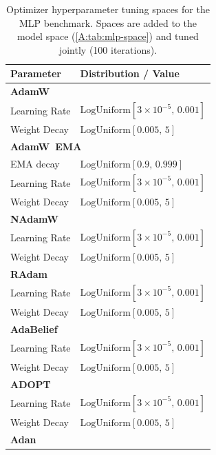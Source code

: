 \begin{table}[h]
\centering
\caption{Optimizer hyperparameter tuning spaces for the MLP benchmark.
Spaces are added to the model space (\autoref{A:tab:mlp-space})
and tuned jointly (100 iterations).}
\label{A:tab:optimizer-spaces}
\small
\setlength{\tabcolsep}{4pt}
\renewcommand{\arraystretch}{1.12}

\begin{minipage}[t]{0.48\textwidth}
\vspace{0pt}
\begin{tabular}{@{}ll@{}}
\toprule
Parameter & Distribution / Value \\
\midrule
\multicolumn{2}{l}{\textbf{AdamW}} \\
\quad Learning Rate & $\mathrm{LogUniform}[3 \!\times\! 10^{-5},\,0.001]$ \\
\quad Weight Decay & $\mathrm{LogUniform}[0.005,\,5]$ \\
\midrule
\multicolumn{2}{l}{\textbf{AdamW\ EMA}} \\
\quad EMA decay & $\mathrm{LogUniform}[0.9,\,0.999]$ \\
\quad Learning Rate & $\mathrm{LogUniform}[3 \!\times\! 10^{-5},\,0.001]$ \\
\quad Weight Decay & $\mathrm{LogUniform}[0.005,\,5]$ \\
\midrule
\multicolumn{2}{l}{\textbf{NAdamW}} \\
\quad Learning Rate & $\mathrm{LogUniform}[3 \!\times\! 10^{-5},\,0.001]$ \\
\quad Weight Decay & $\mathrm{LogUniform}[0.005,\,5]$ \\
\midrule
\multicolumn{2}{l}{\textbf{RAdam}} \\
\quad Learning Rate & $\mathrm{LogUniform}[3 \!\times\! 10^{-5},\,0.001]$ \\
\quad Weight Decay & $\mathrm{LogUniform}[0.005,\,5]$ \\
\midrule
\multicolumn{2}{l}{\textbf{AdaBelief}} \\
\quad Learning Rate & $\mathrm{LogUniform}[3 \!\times\! 10^{-5},\,0.001]$ \\
\quad Weight Decay & $\mathrm{LogUniform}[0.005,\,5]$ \\
\midrule
\multicolumn{2}{l}{\textbf{ADOPT}} \\
\quad Learning Rate & $\mathrm{LogUniform}[3 \!\times\! 10^{-5},\,0.001]$ \\
\quad Weight Decay & $\mathrm{LogUniform}[0.005,\,5]$ \\
\midrule
\multicolumn{2}{l}{\textbf{Adan}} \\

\end{tabular}
\end{minipage}
\end{table}
